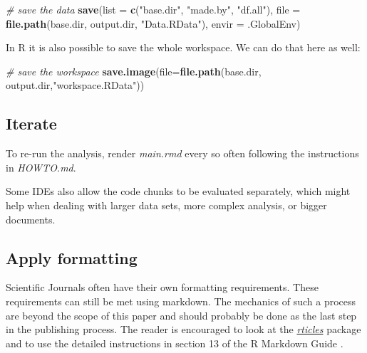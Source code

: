 \documentclass[11pt,]{article}
\newenvironment{Shaded}{\begin{snugshade}}{\end{snugshade}}
\newcommand{\CommentTok}[1]{\textcolor[rgb]{0.56,0.35,0.01}{\textit{#1}}}
\newcommand{\DataTypeTok}[1]{\textcolor[rgb]{0.13,0.29,0.53}{#1}}
\newcommand{\KeywordTok}[1]{\textcolor[rgb]{0.13,0.29,0.53}{\textbf{#1}}}
\newcommand{\NormalTok}[1]{#1}
\newcommand{\StringTok}[1]{\textcolor[rgb]{0.31,0.60,0.02}{#1}}
\begin{document}
\begin{Shaded}
\begin{Highlighting}[]
\CommentTok{# save the data}
\KeywordTok{save}\NormalTok{(}\DataTypeTok{list =} \KeywordTok{c}\NormalTok{(}\StringTok{"base.dir"}\NormalTok{,}
              \StringTok{"made.by"}\NormalTok{,}
              \StringTok{"df.all"}\NormalTok{),}
       \DataTypeTok{file =} \KeywordTok{file.path}\NormalTok{(base.dir, output.dir, }\StringTok{"Data.RData"}\NormalTok{),}
       \DataTypeTok{envir =}\NormalTok{ .GlobalEnv)}
\end{Highlighting}
\end{Shaded}

In R it is also possible to save the whole workspace. We can do that here as well:

\begin{Shaded}
\begin{Highlighting}[]
\CommentTok{# save the workspace}
\KeywordTok{save.image}\NormalTok{(}\DataTypeTok{file=}\KeywordTok{file.path}\NormalTok{(base.dir, output.dir,}\StringTok{"workspace.RData"}\NormalTok{))}
\end{Highlighting}
\end{Shaded}

\hypertarget{implementIterate}{%
\subsection{Iterate}\label{implementIterate}}

To re-run the analysis, render \emph{main.rmd} every so often following the instructions in \emph{HOWTO.md}.

Some IDEs also allow the code chunks to be evaluated separately, which might help when dealing with larger data sets, more complex analysis, or bigger documents.

\hypertarget{implementFformat}{%
\subsection{Apply formatting}\label{implementFformat}}

Scientific Journals often have their own formatting requirements. These requirements can still be met using markdown. The mechanics of such a process are beyond the scope of this paper and should probably be done as the last step in the publishing process. The reader is encouraged to look at the \href{https://github.com/rstudio/rticles}{\emph{rticles}} package and to use the detailed instructions in section 13 of the R Markdown Guide \citep{R-Markdown-Guide}.
\end{document}
